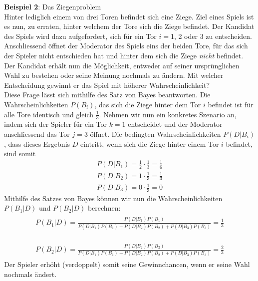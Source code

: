 \begin{center}
\begin{tcolorbox}[enhanced,width=6in, drop fuzzy shadow southwest,
colframe=blue!50!black,colback=blue!01]
\textbf{Beispiel 2}: Das Ziegenproblem \\

Hinter lediglich einem von drei Toren befindet sich eine Ziege. Ziel eines Spiels ist es nun, zu erraten, hinter welchem der Tore sich die Ziege befindet. Der Kandidat des Spiels wird dazu aufgefordert, sich für ein Tor $i=$1, 2 oder 3 zu entscheiden. Anschliessend öffnet der Moderator des Spiels eins der beiden Tore, für das sich der Spieler nicht entschieden hat und hinter dem sich die Ziege \textit{nicht} befindet. Der Kandidat erhält nun die Möglichkeit, entweder auf seiner ursprünglichen Wahl zu bestehen oder seine Meinung nochmals zu ändern. Mit welcher Entscheidung gewinnt er das Spiel mit höherer Wahrscheinlichkeit? \\

Diese Frage lässt sich mithilfe des Satz von Bayes beantworten. Die Wahrscheinlichkeiten $P(B_i)$, das sich die Ziege hinter dem Tor $i$ befindet ist für alle Tore identisch und gleich $\frac{1}{3}$. Nehmen wir nun ein konkretes Szenario an, indem sich der Spieler für ein Tor $k=1$ entscheidet und der Moderator anschliessend das Tor $j=3$ öffnet. Die bedingten Wahrscheinlichkeiten $P(D|B_i)$, dass dieses Ergebnis $D$ eintritt, wenn sich die Ziege hinter einem Tor $i$ befindet, sind somit
\begin{align}
P(D|B_1) = \frac{1}{2} \cdot \frac{1}{3} = \frac{1}{6} 
\end{align}
\begin{align}
P(D|B_2) = 1 \cdot \frac{1}{3} = \frac{1}{3}
\end{align}
\begin{align}
P(D|B_3) = 0 \cdot \frac{1}{3} = 0
\end{align}
Mithilfe des Satzes von Bayes können wir nun die Wahrscheinlichkeiten $P(B_1|D)$ und $P(B_2|D)$ berechnen:
\begin{align}
\begin{split}
P(B_1|D) = \frac{P(D|B_1)P(B_1)}{P(D|B_1)P(B_1) + P(D|B_2)P(B_2) + P(D|B_3)P(B_3)} = \frac{1}{3}
\end{split}
\end{align}

\begin{align}
\begin{split}
P(B_2|D) = \frac{P(D|B_2)P(B_2)}{P(D|B_1)P(B_1) + P(D|B_2)P(B_2) + P(D|B_3)P(B_3)} = \frac{2}{3}
\end{split}
\end{align}
Der Spieler erhöht (verdoppelt) somit seine Gewinnchancen, wenn er seine Wahl nochmals ändert.
\end{tcolorbox}
\end{center}






